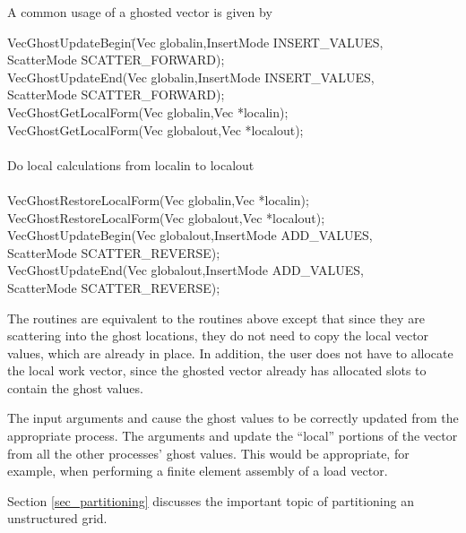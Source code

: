 A common usage of a ghosted vector is given by
 
\begin{tabbing}
  VecGhostUpdateBegin\=(Vec globalin,InsertMode INSERT\_VALUES,\\
                      \>             ScatterMode SCATTER\_FORWARD);\\
  VecGhostUpdateEnd(Vec globalin,InsertMode INSERT\_VALUES,\\
                      \>           ScatterMode SCATTER\_FORWARD);\\
  VecGhostGetLocalForm(Vec globalin,Vec *localin);\\
  VecGhostGetLocalForm(Vec globalout,Vec *localout);\\
   \trl{/*}\\
      Do local calculations from localin to localout \\
   \trl{*/}\\
  VecGhostRestoreLocalForm(Vec globalin,Vec *localin);\\
  VecGhostRestoreLocalForm(Vec globalout,Vec *localout);\\
  VecGhostUpdateBegin(Vec globalout,InsertMode ADD\_VALUES,\\
                        \>            ScatterMode SCATTER\_REVERSE);\\
  VecGhostUpdateEnd(Vec globalout,InsertMode ADD\_VALUES,\\
                        \>          ScatterMode SCATTER\_REVERSE);
\end{tabbing}
      
The routines  are equivalent to the routines 
above except that since they are scattering into the ghost locations, they do not need
to copy the local vector values, which are already in place. In addition, the user does not
have to allocate the local work vector, since the ghosted vector already has allocated 
slots to contain the ghost values.

The input arguments  and 
cause the ghost values to be correctly updated from the appropriate
process. The arguments  and 
update the ``local'' portions of the vector from all the other
processes' ghost values.  This would be appropriate, for example,
when performing a finite element assembly of a load vector.

Section \ref{sec_partitioning} discusses the important topic of partitioning 
an unstructured grid.


